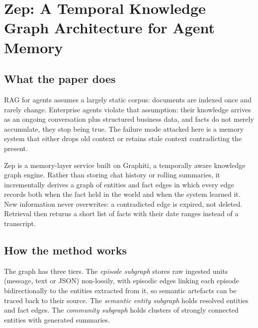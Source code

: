 \section{Zep: A Temporal Knowledge Graph Architecture for Agent Memory}

\subsection{What the paper does}

RAG for agents assumes a largely static corpus: documents are indexed once and rarely change. Enterprise agents violate that assumption: their knowledge arrives as an ongoing conversation plus structured business data, and facts do not merely accumulate, they stop being true. The failure mode attacked here is a memory system that either drops old context or retains stale context contradicting the present.

Zep is a memory-layer service built on Graphiti, a temporally aware knowledge graph engine. Rather than storing chat history or rolling summaries, it incrementally derives a graph of entities and fact edges in which every edge records both when the fact held in the world and when the system learned it. New information never overwrites: a contradicted edge is expired, not deleted. Retrieval then returns a short list of facts with their date ranges instead of a transcript.

\subsection{How the method works}

The graph has three tiers. The \emph{episode subgraph} stores raw ingested units (message, text or JSON) non-lossily, with episodic edges linking each episode bidirectionally to the entities extracted from it, so semantic artefacts can be traced back to their source. The \emph{semantic entity subgraph} holds resolved entities and fact edges. The \emph{community subgraph} holds clusters of strongly connected entities with generated summaries.

